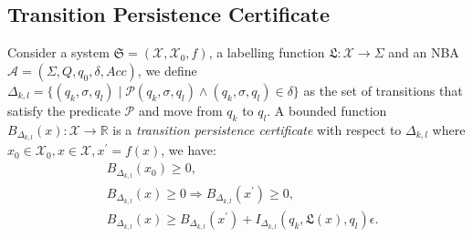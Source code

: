 \documentclass[acmlarge]{acmart}
\begin{document}
  



\subsection{Transition Persistence Certificate}
\begin{definition}
  \label{bsbstct}
  Consider a system $\mathfrak{S} = (\mathcal{X}, \mathcal{X}_0, f)$, a labelling function $\mathfrak{L}:\mathcal{X} \rightarrow \Sigma$ and an NBA $\mathcal{A}=(\Sigma, Q, q_0, \delta, Acc)$, we define $\Delta_{k, l} = \{(q_k, \sigma, q_l) \mid \mathcal{P}(q_k, \sigma, q_l) \land (q_k, \sigma, q_l) \in \delta\}$
  as the set of transitions that satisfy the predicate $\mathcal{P}$ and move from $q_k$ to $q_l$.
  A bounded function $B_{\Delta_{k, l}}(x): \mathcal{X} \rightarrow \mathbb{R}$ is a \emph{transition persistence certificate} with
  respect to $\Delta_{k,l}$ where $x_0 \in \mathcal{X}_0, x \in \mathcal{X}, x^{\prime} = f(x)$, we have:
  \begin{align}
    &B_{\Delta_{k, l}}(x_0) \geq 0, \label{bstnn} \\
    &B_{\Delta_{k, l}}(x) \geq 0 \Rightarrow B_{\Delta_{k, l}}(x^{\prime}) \geq 0, \label{bsttnn} \\
    &B_{\Delta_{k, l}}(x) \geq B_{\Delta_{k, l}}(x^{\prime}) + I_{\Delta_{k,l}}(q_k, \mathfrak{L}(x), q_l)\epsilon. \label{bstni}
  \end{align}
\end{definition}
\end{document}
